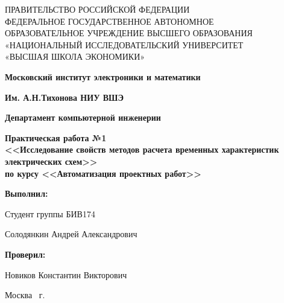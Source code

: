 \begin{titlepage}
	\begin{center}
		ПРАВИТЕЛЬСТВО РОССИЙСКОЙ ФЕДЕРАЦИИ \\
 		ФЕДЕРАЛЬНОЕ  ГОСУДАРСТВЕННОЕ АВТОНОМНОЕ \\
		ОБРАЗОВАТЕЛЬНОЕ УЧРЕЖДЕНИЕ ВЫСШЕГО ОБРАЗОВАНИЯ\\
		«НАЦИОНАЛЬНЫЙ ИССЛЕДОВАТЕЛЬСКИЙ УНИВЕРСИТЕТ\\
		«ВЫСШАЯ ШКОЛА ЭКОНОМИКИ»
	\end{center}
	
	\begin{center}
		\textbf{Московский институт электроники и математики}
		
		\textbf{Им. А.Н.Тихонова НИУ ВШЭ}
		
		\vspace{2ex}
		
		\textbf{Департамент компьютерной инженерии}
	\end{center}
	\vspace{1ex}	
	
	\vspace{1ex}
	\begin{center}
		\textbf{Практическая работа №1 \\
			<<Исследование свойств методов расчета временных характеристик электрических схем>> \\
			по курсу <<Автоматизация проектных работ>>\\
	}
	\end{center}	

	\vspace{2ex}
	\vfill
	
	\vspace{2ex}
	
	\begin{flushright}
		\textbf{Выполнил:}
		
		\vspace{2ex}
		
		Студент группы БИВ174
		
		\vspace{2ex}
		
		Солодянкин Андрей Александрович
		
		\vspace{2ex}
		
		\textbf{Проверил:}
		
		\vspace{2ex}
		
		Новиков Константин Викторович
	\end{flushright}

	\vspace{5ex}
	\begin{center}
		Москва \the\year \, г.
	\end{center}
	
\end{titlepage}
\addtocounter{page}{1}